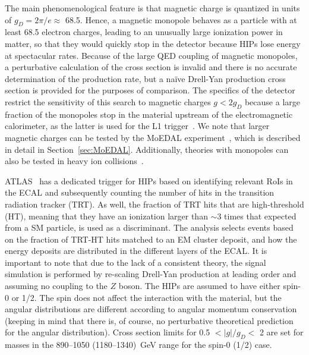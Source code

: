 The main phenomenological feature is that magnetic charge is quantized in units of $g_D = 2\pi/e \approx$ 68.5. Hence, a magnetic monopole behaves as a particle with at least 68.5 electron charges, leading to an unusually large ionization power in matter, so that they would quickly stop in the detector because HIPs lose energy at spectacular rates. Because of the large QED coupling of magnetic monopoles, a perturbative calculation of the cross section is invalid and there is no accurate determination of the production rate, but a na\"ive Drell-Yan production cross section is provided for the purposes of comparison. The specifics of the detector restrict the sensitivity of this search to magnetic charges $g < 2 g_D$ because a large fraction of the monopoles stop in the material upstream of the electromagnetic calorimeter, as the latter is used for the L1 trigger~\cite{DeRoeck:2011aa}. We note that larger magnetic charges can be tested by the MoEDAL experiment~\cite{MoEDAL:2016jlb}, which is described in detail in Section~\ref{sec:MoEDAL}. Additionally, theories with monopoles can also be tested in heavy ion collisions~\cite{Bruce:2018yzs}.

ATLAS~\cite{Aad:2015kta} has a dedicated trigger for HIPs based on identifying relevant RoIs in the ECAL and subsequently counting the number of hits in the transition radiation tracker (TRT). As well, the fraction of TRT hits that are high-threshold (HT), meaning that they have an ionization larger than $\sim3$ times that expected from a SM particle, is used as a discriminant. The analysis selects events based on the fraction of TRT-HT hits matched to an EM cluster deposit, and how the energy deposits are distributed in the different layers of the ECAL. It is important to note that due to the lack of a consistent theory, the signal simulation is performed by re-scaling Drell-Yan production at leading order and assuming no coupling to the $Z$ boson. The HIPs are assumed to have either spin-0 or 1/2. The spin does not affect the interaction with the material, but the angular distributions are different according to angular momentum conservation (keeping in mind that there is, of course, no perturbative theoretical prediction for the angular distribution). Cross section limits for 0.5 $< |g|/g_D <$ 2 are set for masses in the 890--1050 (1180--1340)~GeV range for the spin-0 (1/2) case.

